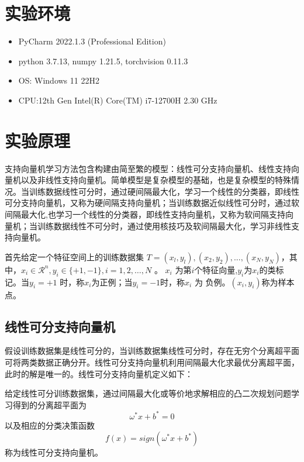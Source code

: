 \documentclass{progartcn}
\begin{document}
\section{实验环境}
\begin{itemize}
	\item PyCharm 2022.1.3 (Professional Edition)
	\item python 3.7.13, numpy 1.21.5, torchvision 0.11.3
	\item OS: Windows 11 22H2
	\item CPU:12th Gen Intel(R) Core(TM) i7-12700H 2.30 GHz
\end{itemize}
\section{实验原理}
支持向量机学习方法包含构建由简至繁的模型：线性可分支持向量机、线性支持向量机以及非线性支持向量机。简单模型是复杂模型的基础，也是复杂模型的特殊情况。当训练数据线性可分时，通过硬间隔最大化，学习一个线性的分类器，即线性可分支持向量机，又称为硬间隔支持向量机；当训练数据近似线性可分时，通过软间隔最大化,也学习一个线性的分类器，即线性支持向量机，又称为软间隔支持向量机；当训练数据线性不可分时，通过使用核技巧及软间隔最大化，学习非线性支持向量机。

首先给定一个特征空间上的训练数据集
$T = {(x_l , y_l) , (x_2 , y_2) ,... , (x_N , y_N)}$，其中，$ x_i \in \mathcal{R}^n, y_i \in \{+1, -1\}, i = 1, 2,… ,N$ 。 $x_i$ 为第$i$个特征向量,$ y_i $为$x_i$的类标记。当$y_i = +1$ 时，称$x_i$为正例；当$y_i =-1 $时，称$x_i$ 为
负例。$(x_i,y_i)$称为样本点。
\subsection{线性可分支持向量机}
假设训练数据集是线性可分的，当训练数据集线性可分时，存在无穷个分离超平面可将两类数据正确分开。线性可分支持向量机利用间隔最大化求最优分离超平面，此时的解是唯一的。线性可分支持向量机定义如下：

给定线性可分训练数据集，通过间隔最大化或等价地求解相应的凸二次规划问题学习得到的分离超平面为
\begin{equation}
	\omega^*x+b^* = 0
\end{equation}
以及相应的分类决策函数
\begin{equation}
	f(x)=sign(\omega^*x+b^*)
\end{equation}
称为线性可分支持向量机。
\end{document}

